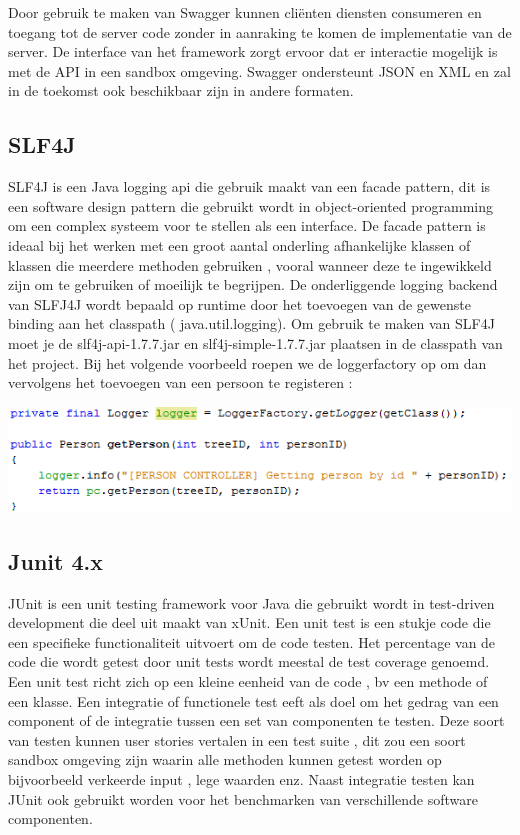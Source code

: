 \documentclass[pdftex,a4paper,12pt,twoside]{report}
\begin{document}
Door gebruik te maken van Swagger kunnen cliënten diensten consumeren en toegang tot de server code zonder in aanraking te komen de implementatie van de server.
De interface van het framework zorgt ervoor dat er interactie mogelijk is  met de API in een sandbox omgeving.
Swagger ondersteunt JSON en XML en zal in de toekomst ook beschikbaar zijn in andere formaten.

\subsection{SLF4J}
SLF4J is een Java logging api die gebruik maakt van een facade pattern, dit is een software design pattern die gebruikt wordt in object-oriented programming om een complex systeem voor te stellen als een interface.
De facade pattern is ideaal bij het werken met een groot aantal onderling afhankelijke klassen of klassen die meerdere methoden gebruiken , vooral wanneer deze te ingewikkeld zijn om te gebruiken of moeilijk te begrijpen.
De onderliggende logging backend van SLFJ4J wordt bepaald op runtime door het toevoegen van de gewenste binding aan het classpath ( java.util.logging).
Om gebruik te maken van SLF4J moet je de slf4j-api-1.7.7.jar en slf4j-simple-1.7.7.jar plaatsen in de classpath van het project.
Bij het volgende voorbeeld roepen we de loggerfactory op om dan vervolgens het toevoegen van een persoon te registeren :


\includegraphics{images/logger.png}\\


\subsection{Junit 4.x}
JUnit is een unit testing framework voor Java die gebruikt wordt in test-driven development die deel uit maakt van xUnit.
Een unit test is een stukje code die een specifieke functionaliteit uitvoert om de code testen. Het percentage van de code die wordt getest door unit tests wordt meestal de test coverage genoemd.
Een unit test richt zich op een kleine eenheid van de code , bv een methode of een klasse.
Een integratie of functionele test eeft als doel om het gedrag van een component of de integratie tussen een set van componenten te testen.
Deze soort van testen kunnen user stories vertalen in een test suite , dit zou een soort sandbox omgeving zijn waarin alle methoden kunnen getest worden op bijvoorbeeld verkeerde input , lege waarden enz.
Naast integratie testen kan JUnit ook gebruikt worden voor het benchmarken van verschillende software componenten.
\end{document}
